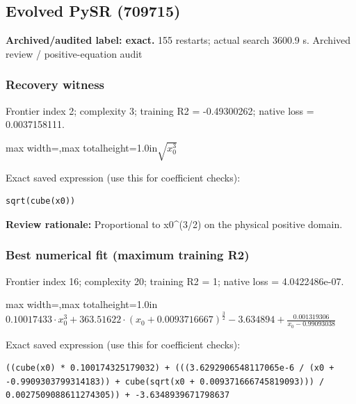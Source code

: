\documentclass[10pt,letterpaper,landscape]{article}
\begin{document}
\begin{minipage}[t]{0.485\textwidth}
\subsection*{Evolved PySR (709715)}
\textbf{Archived/audited label: exact.} 155 restarts; actual search 3600.9 s.
{\small Archived review / positive-equation audit}
\subsubsection*{Recovery witness}
Frontier index 2; complexity 3; training R2 = -0.49300262; native loss = 0.0037158111.
\begin{center}\begin{adjustbox}{max width=\linewidth,max totalheight=1.0in}$\displaystyle \sqrt{x_{0}^{3}}$\end{adjustbox}\end{center}
{\scriptsize Exact saved expression (use this for coefficient checks):}
\begin{lstlisting}
sqrt(cube(x0))
\end{lstlisting}
{\small\textbf{Review rationale:} Proportional to x0\textasciicircum{}(3/2) on the physical positive domain.}
\subsubsection*{Best numerical fit (maximum training R2)}
Frontier index 16; complexity 20; training R2 = 1; native loss = 4.0422486e-07.
\begin{center}\begin{adjustbox}{max width=\linewidth,max totalheight=1.0in}$\displaystyle 0.10017433 \cdot x_{0}^{3} + 363.51622 \cdot \left(x_{0} + 0.0093716667\right)^{\frac{3}{2}} - 3.634894 + \frac{0.001319306}{x_{0} - 0.99093038}$\end{adjustbox}\end{center}
{\scriptsize Exact saved expression (use this for coefficient checks):}
\begin{lstlisting}
((cube(x0) * 0.100174325179032) + (((3.6292906548117065e-6 / (x0 + -0.9909303799314183)) + cube(sqrt(x0 + 0.009371666745819093))) / 0.0027509088611274305)) + -3.6348939671798637
\end{lstlisting}
\end{minipage}
\clearpage{}\label{kepler-10002}
\end{document}
